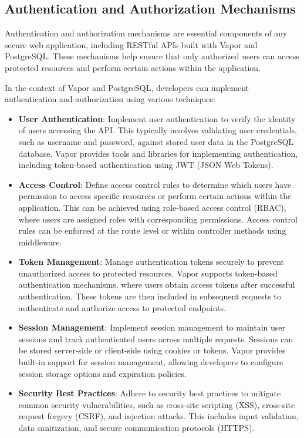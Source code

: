 \documentclass[
  biblatex,
  language=english,
  figures=false,
  sourcecodes,
  glossaries,
  index
]{kidiplom}
\begin{document}
\subsection{Authentication and Authorization Mechanisms}

Authentication and authorization mechanisms are essential components of any secure web application, including RESTful APIs built with Vapor and PostgreSQL. These mechanisms help ensure that only authorized users can access protected resources and perform certain actions within the application.

In the context of Vapor and PostgreSQL, developers can implement authentication and authorization using various techniques:

\begin{itemize}
    \item \textbf{User Authentication}: Implement user authentication to verify the identity of users accessing the API. This typically involves validating user credentials, such as username and password, against stored user data in the PostgreSQL database. Vapor provides tools and libraries for implementing authentication, including token-based authentication using JWT (JSON Web Tokens).
    
    \item \textbf{Access Control}: Define access control rules to determine which users have permission to access specific resources or perform certain actions within the application. This can be achieved using role-based access control (RBAC), where users are assigned roles with corresponding permissions. Access control rules can be enforced at the route level or within controller methods using middleware.
    
    \item \textbf{Token Management}: Manage authentication tokens securely to prevent unauthorized access to protected resources. Vapor supports token-based authentication mechanisms, where users obtain access tokens after successful authentication. These tokens are then included in subsequent requests to authenticate and authorize access to protected endpoints.
    
    \item \textbf{Session Management}: Implement session management to maintain user sessions and track authenticated users across multiple requests. Sessions can be stored server-side or client-side using cookies or tokens. Vapor provides built-in support for session management, allowing developers to configure session storage options and expiration policies.
    
    \item \textbf{Security Best Practices}: Adhere to security best practices to mitigate common security vulnerabilities, such as cross-site scripting (XSS), cross-site request forgery (CSRF), and injection attacks. This includes input validation, data sanitization, and secure communication protocols (HTTPS).
\end{itemize}
\end{document}

